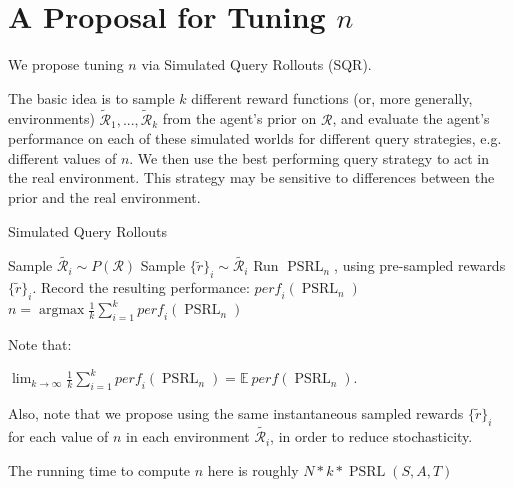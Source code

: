 \documentclass{article}
\begin{document}
\section{A Proposal for Tuning $n$}
We propose tuning $n$ via Simulated Query Rollouts (SQR). 

The basic idea is to sample $k$ different reward functions (or, more generally, environments) $\mathcal{\tilde{R}}_1, ..., \mathcal{\tilde{R}}_k$ from the agent's prior on $\mathcal{R}$, and evaluate the agent's performance on each of these simulated worlds for different query strategies, e.g. different values of $n$.
We then use the best performing query strategy to act in the real environment.
This strategy may be sensitive to differences between the prior and the real environment.



\begin{algorithm}
\caption{Simulated Query Rollouts}
\label{SQR}
\begin{algorithmic}[1]
	\State Sample $\tilde{\mathcal{R}_i} \sim P(\mathcal{R})$
	\State Sample $\{\tilde{r}\}_i \sim \tilde{\mathcal{R}_i}$
		\State Run $\mathop{PSRL}_n$, using pre-sampled rewards $\{\tilde{r}\}_i$.
		\State Record the resulting performance: $\mathit{perf}_i(\mathop{PSRL}_n)$
	\EndFor
\EndFor
\Return $n = \mathop{\mathrm{argmax}} \frac{1}{k} \sum_{i=1}^k \mathit{perf}_i(\mathop{PSRL}_n)$ 
\end{algorithmic}
\end{algorithm}

Note that:

$
\lim_{k \rightarrow \infty} \frac{1}{k} \sum_{i=1}^k \mathit{perf}_i(\mathop{PSRL}_n) = \mathbb{E} \: \mathit{perf}(\mathop{PSRL}_n).
$

Also, note that we propose using the same instantaneous sampled rewards $\{\tilde{r}\}_i$ for each value of $n$ in each environment $\tilde{\mathcal{R}_i}$, in order to reduce stochasticity.

The running time to compute $n$ here is roughly $N * k * \mathop{PSRL}(S, A, T) $

\end{document}
